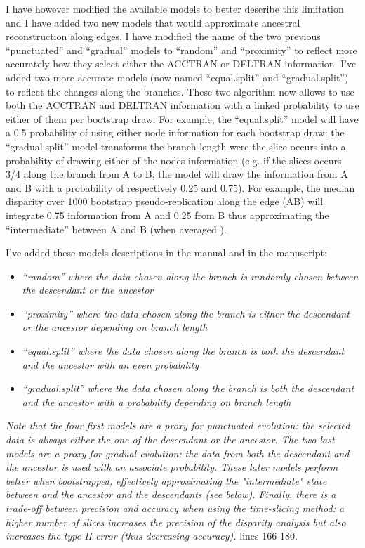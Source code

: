 \documentclass[12pt,letterpaper]{article}
\begin{document}
\begin{enumerate}
I have however modified the available models to better describe this limitation and I have added two new models that would approximate ancestral reconstruction along edges.
I have modified the name of the two previous ``punctuated'' and ``gradual'' models to ``random'' and ``proximity'' to reflect more accurately how they select either the ACCTRAN or DELTRAN information.
I've added two more accurate models (now named ``equal.split'' and ``gradual.split'') to reflect the changes along the branches.
These two algorithm now allows to use both the ACCTRAN and DELTRAN information with a linked probability to use either of them per bootstrap draw.
For example, the ``equal.split'' model will have a 0.5 probability of using either node information for each bootstrap draw; the ``gradual.split'' model transforms the branch length were the slice occurs into a probability of drawing either of the nodes information (e.g. if the slices occurs 3/4 along the branch from A to B, the model will draw the information from A and B with a probability of respectively 0.25 and 0.75).
For example, the median disparity over 1000 bootstrap pseudo-replication along the edge (AB) will integrate 0.75 information from A and 0.25 from B thus approximating the ``intermediate'' between A and B (when averaged ).

I've added these models descriptions in the manual and in the manuscript:

\begin{itemize}
    \item \textit{``random'' where the data chosen along the branch is randomly chosen between the descendant or the ancestor}
    \item \textit{``proximity'' where the data chosen along the branch is either the descendant or the ancestor depending on branch length}
    \item \textit{``equal.split'' where the data chosen along the branch is both the descendant and the ancestor with an even probability}
    \item \textit{``gradual.split'' where the data chosen along the branch is both the descendant and the ancestor with a probability depending on branch length}
\end{itemize}

\textit{Note that the four first models are a proxy for punctuated evolution: the selected data is always either the one of the descendant or the ancestor.
The two last models are a proxy for gradual evolution: the data from both the descendant and the ancestor is used with an associate probability.
These later models perform better when bootstrapped, effectively approximating the "intermediate" state between and the ancestor and the descendants (see below).
Finally, there is a trade-off between precision and accuracy when using the time-slicing method: a higher number of slices increases the precision of the disparity analysis but also increases the type II error (thus decreasing accuracy).} lines 166-180.



\end{enumerate}
\end{document}
